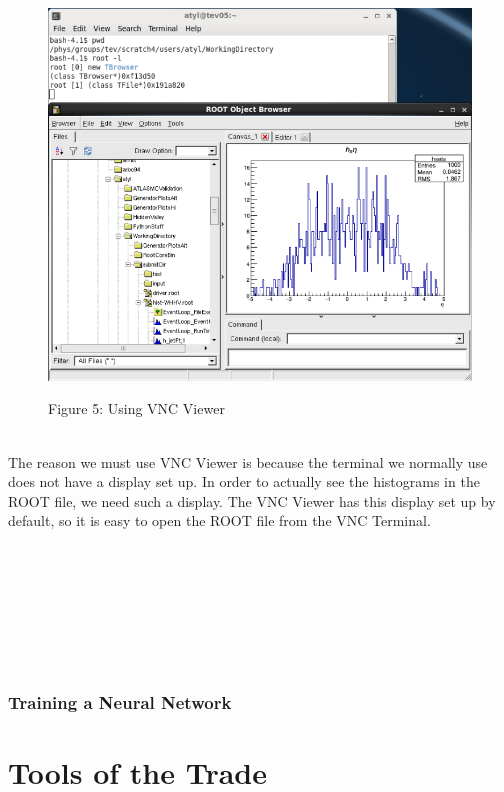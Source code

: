 \documentclass[10pt,a4paper]{report}
\begin{document}
\begin{figure}
\includegraphics[scale=.3]{Figure5}
\begin{center}
{\scriptsize Figure 5: Using VNC Viewer}
\end{center}
\end{figure}
\noindent \\The reason we must use VNC Viewer is because the terminal we normally use does not have a display set up. In order to actually see the histograms in the ROOT file, we need such a display. The VNC Viewer has this display set up by default, so it is easy to open the ROOT file from the VNC Terminal.\\\\\\\\\\\\\\\\

\section*{Training a Neural Network}

\part*{Tools of the Trade}
\end{document}
